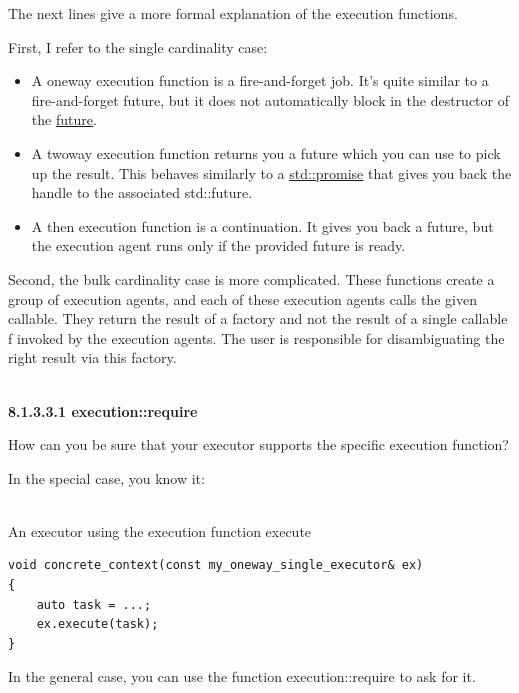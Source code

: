 The next lines give a more formal explanation of the execution functions.

First, I refer to the single cardinality case:

\begin{itemize}
\item 
A oneway execution function is a fire-and-forget job. It’s quite similar to a fire-and-forget future, but it does not automatically block in the destructor of the \href{https://www.modernescpp.com/index.php/the-special-futures}{future}.

\item
A twoway execution function returns you a future which you can use to pick up the result. This behaves similarly to a \href{https://www.modernescpp.com/index.php/promise-and-future}{std::promise} that gives you back the handle to the associated std::future.

\item
A then execution function is a continuation. It gives you back a future, but the execution agent runs only if the provided future is ready.
\end{itemize}

Second, the bulk cardinality case is more complicated. These functions create a group of execution agents, and each of these execution agents calls the given callable. They return the result of a factory and not the result of a single callable f invoked by the execution agents. The user is responsible for disambiguating the right result via this factory.

\hspace*{\fill} \\ %
\noindent
\textbf{8.1.3.3.1\hspace{0.2cm} execution::require}

How can you be sure that your executor supports the specific execution function?

In the special case, you know it:

\hspace*{\fill} \\ %
\noindent
An executor using the execution function execute
\begin{lstlisting}[style=styleCXX]
void concrete_context(const my_oneway_single_executor& ex)
{
	auto task = ...;
	ex.execute(task);
}
\end{lstlisting}

In the general case, you can use the function execution::require to ask for it.

